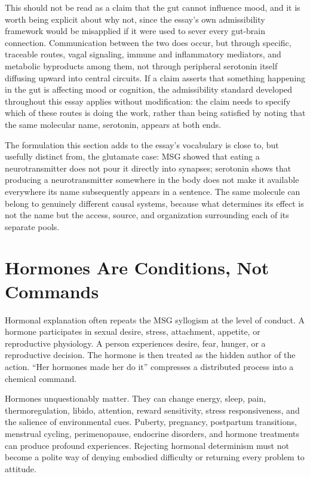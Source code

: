 \documentclass[11pt]{article}
\begin{document}
This should not be read as a claim that the gut cannot influence mood, and it is worth being explicit about why not, since the essay's own admissibility framework would be misapplied if it were used to sever every gut-brain connection. Communication between the two does occur, but through specific, traceable routes, vagal signaling, immune and inflammatory mediators, and metabolic byproducts among them, not through peripheral serotonin itself diffusing upward into central circuits. If a claim asserts that something happening in the gut is affecting mood or cognition, the admissibility standard developed throughout this essay applies without modification: the claim needs to specify which of these routes is doing the work, rather than being satisfied by noting that the same molecular name, serotonin, appears at both ends.

The formulation this section adds to the essay's vocabulary is close to, but usefully distinct from, the glutamate case: MSG showed that eating a neurotransmitter does not pour it directly into synapses; serotonin shows that producing a neurotransmitter somewhere in the body does not make it available everywhere its name subsequently appears in a sentence. The same molecule can belong to genuinely different causal systems, because what determines its effect is not the name but the access, source, and organization surrounding each of its separate pools.

\section{Hormones Are Conditions, Not Commands}

Hormonal explanation often repeats the MSG syllogism at the level of conduct. A hormone participates in sexual desire, stress, attachment, appetite, or reproductive physiology. A person experiences desire, fear, hunger, or a reproductive decision. The hormone is then treated as the hidden author of the action. ``Her hormones made her do it'' compresses a distributed process into a chemical command.

Hormones unquestionably matter. They can change energy, sleep, pain, thermoregulation, libido, attention, reward sensitivity, stress responsiveness, and the salience of environmental cues. Puberty, pregnancy, postpartum transitions, menstrual cycling, perimenopause, endocrine disorders, and hormone treatments can produce profound experiences. Rejecting hormonal determinism must not become a polite way of denying embodied difficulty or returning every problem to attitude.
\end{document}
